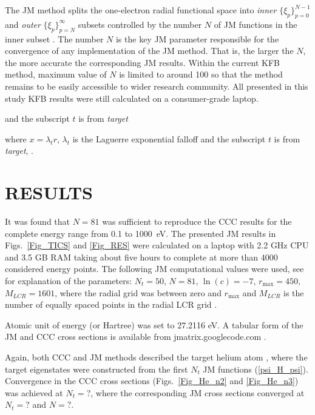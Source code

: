 \documentclass[aip
, pra
, showpacs
, aps
, twocolumn
, groupedaddress
, floatfix
]{revtex4}
\begin{document}
The JM method splits the one-electron radial functional space into {\em inner} $\{\xi_p\}_{p=0}^{N-1}$
and {\em outer} $\{\xi_p\}_{p=N}^\infty$
subsets controlled by the number $N$ of JM functions in the inner subset \cite{HY74p1201,BR76p1491}.
The number $N$ is the key JM parameter responsible for the convergence of any implementation of the JM method. 
That is, the larger the $N$, the more accurate the corresponding JM results.
Within the current KFB method, maximum value of $N$ is limited to around 100 so that the method remains to be easily accessible
to wider research community. All presented in this study KFB results were still calculated on a consumer-grade laptop.



and the subscript $t$ is from {\em target}
 
where $x=\lambda_t r$,  $\lambda_t$ is the Laguerre exponential falloff and the subscript $t$ is from {\em target},
.






\section{RESULTS}


It was found that $N=81$ was sufficient to reproduce the CCC results for the complete energy range from 0.1 to 1000~eV.
The presented JM results in Figs.~\ref{Fig_TICS} and \ref{Fig_RES} were calculated on a laptop
with 2.2 GHz CPU and 3.5 GB RAM taking about five hours to complete at more than 4000 considered energy points.
The following JM computational values were used, see \cite{KB10p022708} for explanation of the parameters:
$N_t=50$, $N=81$, $\ln(c)=-7$, $r_{\max}=450$,
$M_{LCR}=1601$, where the radial grid was between zero and $r_{\max}$ and
$M_{LCR}$ is the number of equally spaced points in the radial LCR
grid \cite{KB10p022708}.


Atomic unit of energy (or Hartree) was set to 27.2116 eV. 
A tabular form of the JM and CCC cross sections is available from jmatrix.googlecode.com .



Again, both CCC and JM methods described the target helium atom
, where the target eigenstates were constructed from the first $N_t$ JM functions (\ref{psi_H_psi}). Convergence in the CCC cross sections
(Figs.~\ref{Fig_He_n2} and \ref{Fig_He_n3}) was achieved at $N_t=?$, where the corresponding JM cross sections
converged at $N_t=?$ and $N=?$.
\end{document}
